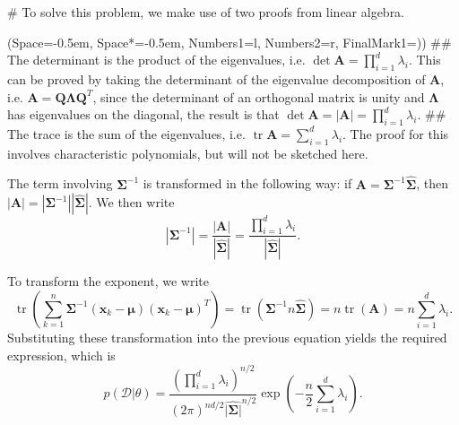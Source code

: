 \documentclass[12pt, a4paper]{article}
\newcommand{\listSpace}{-0.5em}%
\newcommand{\D}{\mathcal{D}}
\newcommand{\vect}[1]{\bm{#1}}
\newcommand{\abs}[1]{\left\lvert#1\right\rvert}
\begin{document}
\begin{easylist}[enumerate]
# To solve this problem, we make use of two proofs from linear algebra.

\begin{easylist}
\ListProperties(Space=\listSpace, Space*=\listSpace, Numbers1=l, Numbers2=r, FinalMark1={)})
## The determinant is the product of the eigenvalues, i.e. $\det \vect{A} = \prod_{i=1}^{d} \lambda_i$.
This can be proved by taking the determinant of the eigenvalue decomposition of $\vect{A}$, i.e. $\vect{A}  = \vect{Q}  \vect{\Lambda} \vect{Q}^T$, since the determinant of an orthogonal matrix is unity and $\vect{\Lambda}$ has eigenvalues on the diagonal, the result is that $\det \vect{A} = \abs{\vect{A}} = \prod_{i=1}^{d} \lambda_i$.
## The trace is the sum of the eigenvalues, i.e. $\operatorname{tr} \vect{A} =\sum_{i=1}^{d} \lambda_i$. The proof for this involves characteristic polynomials, but will not be sketched here.
\end{easylist}

The term involving $\vect{\Sigma}^{-1}$ is transformed in the following way: if $\vect{A} = \vect{\Sigma}^{-1} \hat{\vect{\Sigma}}$, then $\abs{\vect{A}} = \abs{\vect{\Sigma}^{-1}} | \hat{\vect{\Sigma}} |$. We then write
\begin{equation*}
	\abs{\vect{\Sigma}^{-1}} = \frac{\abs{\vect{A}}}{| \hat{\vect{\Sigma}} |} = \frac{\prod_{i=1}^{d} \lambda_i}{| \hat{\vect{\Sigma}} |}.
\end{equation*}

To transform the exponent, we write
\begin{equation*}
	 \operatorname{tr} \left( \sum_{k=1}^{n}  \vect{\Sigma}^{-1} \left( \vect{x}_k - \vect{\mu} \right) \left( \vect{x}_k - \vect{\mu} \right)^T \right)
	 =
	 \operatorname{tr} \left( \vect{\Sigma}^{-1} n \hat{\vect{\Sigma}}  \right)
	 =
	 n  \operatorname{tr} \left( \vect{A} \right) = n \sum_{i=1}^{d} \lambda_i.
\end{equation*}
Substituting these transformation into the previous equation yields the required expression, which is
\begin{equation}
\label{eq:prob3_13}
	p(\D | \theta) = \frac{\left( \prod_{i=1}^{d} \lambda_i \right)^{n/2}}{\left(2 \pi \right)^{nd/2} \hat{\abs{\vect{\Sigma}}}^{n/2} } \exp \left( -\frac{n}{2} \sum_{i=1}^{d} \lambda_i \right).
\end{equation}


\end{easylist}
\end{document}
